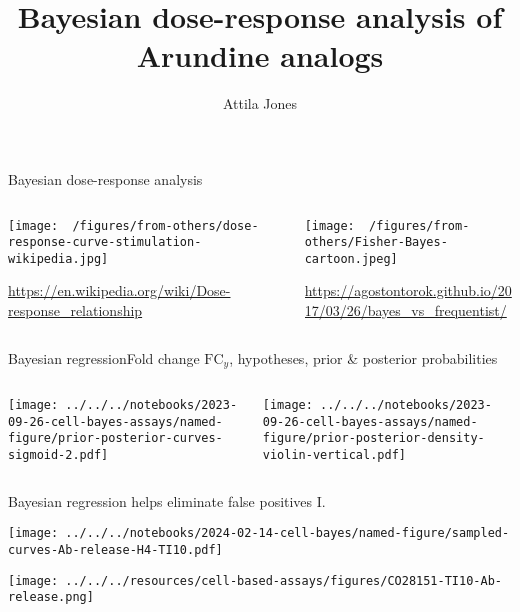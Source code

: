 \documentclass[aspectratio=169]{beamer}
\title{Bayesian dose-response analysis of Arundine analogs}
\subtitle{}
\author{Attila Jones}
\date{}
\begin{document}
\titlepage

\begin{frame}{Bayesian dose-response analysis}
\begin{columns}[t]
\begin{column}{0.5\textwidth}

\texttt{[image: ~/figures/from-others/dose-response-curve-stimulation-wikipedia.jpg]}

\tiny{\url{https://en.wikipedia.org/wiki/Dose-response\_relationship}}
\end{column}

\begin{column}{0.5\textwidth}

\texttt{[image: ~/figures/from-others/Fisher-Bayes-cartoon.jpeg]}

\tiny{\url{https://agostontorok.github.io/2017/03/26/bayes_vs_frequentist/}}
\end{column}
\end{columns}
\end{frame}

\begin{frame}{Bayesian regression}{Fold change $\mathrm{FC}_y$, hypotheses,
  prior \& posterior probabilities}
\begin{columns}[t]
\begin{column}{0.5\textwidth}

\texttt{[image: ../../../notebooks/2023-09-26-cell-bayes-assays/named-figure/prior-posterior-curves-sigmoid-2.pdf]}
\end{column}
\begin{column}{0.5\textwidth}

\texttt{[image: ../../../notebooks/2023-09-26-cell-bayes-assays/named-figure/prior-posterior-density-violin-vertical.pdf]}
\end{column}
\end{columns}
\end{frame}


\begin{frame}{Bayesian regression helps eliminate false positives I.}
\begin{center}
\texttt{[image: ../../../notebooks/2024-02-14-cell-bayes/named-figure/sampled-curves-Ab-release-H4-TI10.pdf]}
\end{center}

\begin{center}
\texttt{[image: ../../../resources/cell-based-assays/figures/CO28151-TI10-Ab-release.png]}
\end{center}
\end{frame}
\end{document}
